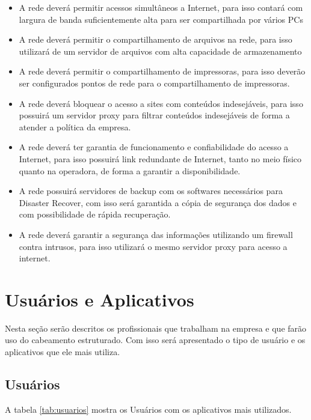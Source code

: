 \documentclass[	DIV=calc,%
							paper=a4,%
							fontsize=12pt,%
							onecolumn]{scrartcl}	 					%
\begin{document}
\begin{itemize}				
\item A rede deverá permitir acessos simultâneos a Internet, para isso contará com largura de banda suficientemente alta para ser compartilhada por vários PCs
\item A rede deverá permitir o compartilhamento de arquivos na rede, para isso utilizará de um servidor de arquivos com alta capacidade de armazenamento 
\item A rede deverá permitir o compartilhamento de impressoras, para isso deverão ser configurados pontos de rede para o compartilhamento de impressoras.		
\item A rede deverá bloquear o acesso a sites com conteúdos indesejáveis, para isso possuirá um servidor proxy para filtrar conteúdos indesejáveis de forma a atender a política da empresa.
\item A rede deverá ter garantia de funcionamento e confiabilidade do acesso a Internet, para isso possuirá link redundante de Internet, tanto no meio físico quanto na operadora, de forma a garantir a disponibilidade.
\item A rede possuirá servidores de backup com os softwares necessários para Disaster Recover, com isso será garantida a cópia de segurança dos dados e com possibilidade de rápida recuperação.
\item A rede deverá garantir a segurança das informações utilizando um firewall contra intrusos, para isso utilizará o mesmo servidor proxy para acesso a internet.
\end{itemize}

\section{Usuários e Aplicativos}
Nesta seção serão descritos os profissionais que trabalham na empresa e que farão uso do cabeamento estruturado. Com isso será apresentado o tipo de usuário e os aplicativos que ele mais utiliza. 

\subsection{Usuários}

A tabela \ref{tab:usuarios} mostra os Usuários com os aplicativos mais utilizados.
\end{document}
